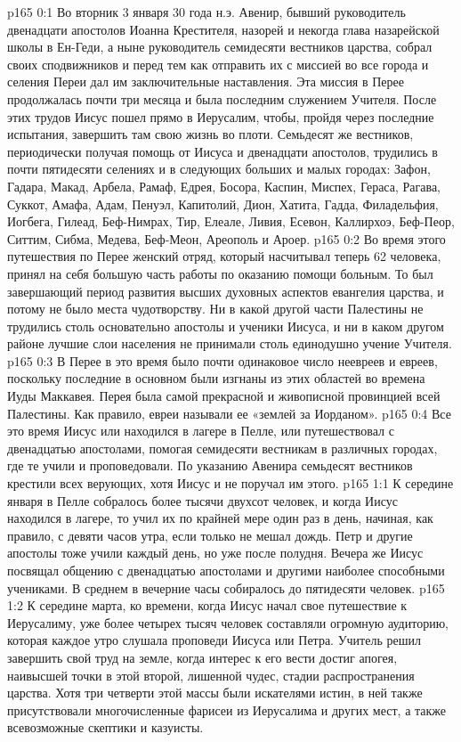 \vs p165 0:1 Во вторник 3 января 30 года н.э. Авенир, бывший руководитель двенадцати апостолов Иоанна Крестителя, назорей и некогда глава назарейской школы в Ен\hyp{}Геди, а ныне руководитель семидесяти вестников царства, собрал своих сподвижников и перед тем как отправить их с миссией во все города и селения Переи дал им заключительные наставления. Эта миссия в Перее продолжалась почти три месяца и была последним служением Учителя. После этих трудов Иисус пошел прямо в Иерусалим, чтобы, пройдя через последние испытания, завершить там свою жизнь во плоти. Семьдесят же вестников, периодически получая помощь от Иисуса и двенадцати апостолов, трудились в почти пятидесяти селениях и в следующих больших и малых городах: Зафон, Гадара, Макад, Арбела, Рамаф, Едрея, Босора, Каспин, Миспех, Гераса, Рагава, Суккот, Амафа, Адам, Пенуэл, Капитолий, Дион, Хатита, Гадда, Филадельфия, Иогбега, Гилеад, Беф\hyp{}Нимрах, Тир, Елеале, Ливия, Есевон, Каллирхоэ, Беф\hyp{}Пеор, Ситтим, Сибма, Медева, Беф\hyp{}Меон, Ареополь и Ароер.
\vs p165 0:2 Во время этого путешествия по Перее женский отряд, который насчитывал теперь 62 человека, принял на себя большую часть работы по оказанию помощи больным. То был завершающий период развития высших духовных аспектов евангелия царства, и потому не было места чудотворству. Ни в какой другой части Палестины не трудились столь основательно апостолы и ученики Иисуса, и ни в каком другом районе лучшие слои населения не принимали столь единодушно учение Учителя.
\vs p165 0:3 В Перее в это время было почти одинаковое число неевреев и евреев, поскольку последние в основном были изгнаны из этих областей во времена Иуды Маккавея. Перея была самой прекрасной и живописной провинцией всей Палестины. Как правило, евреи называли ее «землей за Иорданом».
\vs p165 0:4 Все это время Иисус или находился в лагере в Пелле, или путешествовал с двенадцатью апостолами, помогая семидесяти вестникам в различных городах, где те учили и проповедовали. По указанию Авенира семьдесят вестников крестили всех верующих, хотя Иисус и не поручал им этого.
\vs p165 1:1 К середине января в Пелле собралось более тысячи двухсот человек, и когда Иисус находился в лагере, то учил их по крайней мере один раз в день, начиная, как правило, с девяти часов утра, если только не мешал дождь. Петр и другие апостолы тоже учили каждый день, но уже после полудня. Вечера же Иисус посвящал общению с двенадцатью апостолами и другими наиболее способными учениками. В среднем в вечерние часы собиралось до пятидесяти человек.
\vs p165 1:2 К середине марта, ко времени, когда Иисус начал свое путешествие к Иерусалиму, уже более четырех тысяч человек составляли огромную аудиторию, которая каждое утро слушала проповеди Иисуса или Петра. Учитель решил завершить свой труд на земле, когда интерес к его вести достиг апогея, наивысшей точки в этой второй, лишенной чудес, стадии распространения царства. Хотя три четверти этой массы были искателями истин, в ней также присутствовали многочисленные фарисеи из Иерусалима и других мест, а также всевозможные скептики и казуисты.
